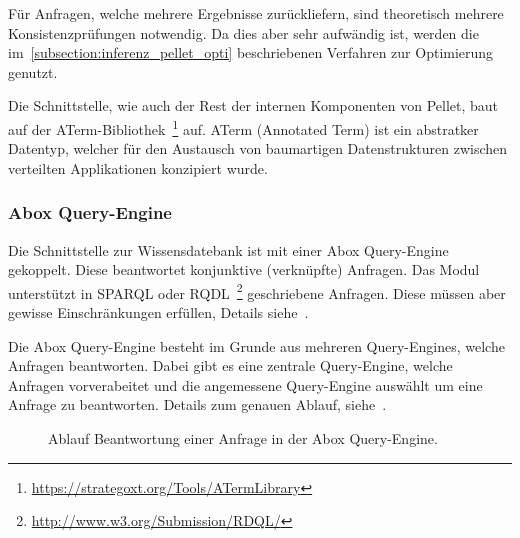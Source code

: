 Für Anfragen, welche mehrere Ergebnisse zurückliefern, sind theoretisch mehrere Konsistenzprüfungen notwendig. Da dies aber sehr aufwändig ist, werden die im~\autoref{subsection:inferenz_pellet_opti} beschriebenen Verfahren zur Optimierung genutzt.

Die Schnittstelle, wie auch der Rest der internen Komponenten von Pellet, baut auf der ATerm-Bibliothek~\footnote{\url{https://strategoxt.org/Tools/ATermLibrary}} auf. ATerm (Annotated Term) ist ein abstratker Datentyp, welcher für den Austausch von baumartigen Datenstrukturen zwischen verteilten Applikationen konzipiert wurde.

\subsubsection{Abox Query-Engine}
\label{ssubsection:inferenz_pellet_aboxquery}
Die Schnittstelle zur Wissensdatebank ist mit einer Abox Query-Engine gekoppelt. Diese beantwortet konjunktive (verknüpfte) Anfragen. Das Modul unterstützt in SPARQL oder RQDL~\footnote{\url{http://www.w3.org/Submission/RDQL/}} geschriebene Anfragen. Diese müssen aber gewisse Einschränkungen erfüllen, Details siehe~\cite[Seiten 10 und 11]{sirin:pellet05}.

Die Abox Query-Engine besteht im Grunde aus mehreren Query-Engines, welche Anfragen beantworten. Dabei gibt es eine zentrale Query-Engine, welche Anfragen vorverabeitet und die angemessene Query-Engine auswählt um eine Anfrage zu beantworten. Details zum genauen Ablauf, siehe~\cite[Seite 11]{sirin:pellet05}.

\begin{figure}[htbp]
    \centering {}
    \caption{Ablauf Beantwortung einer Anfrage in der Abox Query-Engine.\label{fig:pellet_queryengine_komponenten}\protect\footnotemark}
\end{figure}

